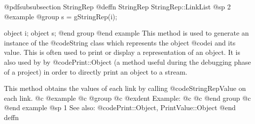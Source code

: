 @pdfsubsubsection {StringRep}
@deffn {StringRep} StringRep::LinkList
@sp 2
@example
@group
s = gStringRep(i);

object  i;
object  s;
@end group
@end example
This method is used to generate an instance of the @code{String} class
which represents the object @code{i} and its value.  This is often used
to print or display a representation of an object.  It is also used by
by @code{Print::Object} (a method useful during the debugging phase of
a project) in order to directly print an object to a stream.


This method obtains the values of each link by calling @code{StringRepValue}
on each link.
@c @example
@c @group
@c @exdent Example:
@c 
@c @end group
@c @end example
@sp 1
See also:  @code{Print::Object, PrintValue::Object}
@end deffn











